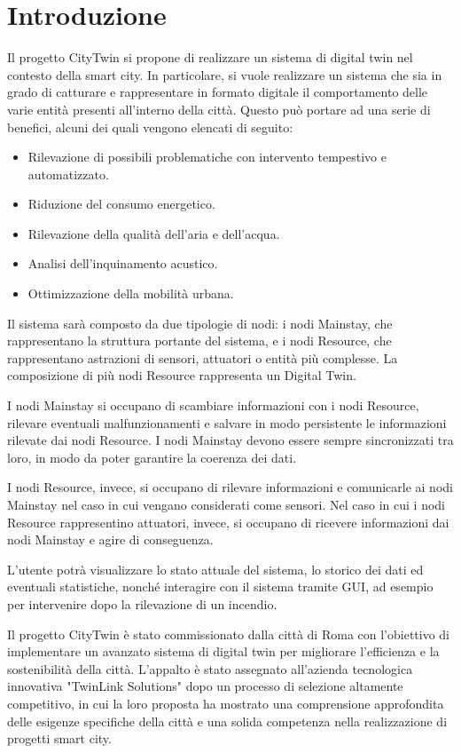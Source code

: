 \chapter{Introduzione}
Il progetto CityTwin si propone di realizzare un sistema di digital twin nel contesto della smart city. In particolare, si vuole realizzare un sistema che sia in grado di catturare e rappresentare in formato digitale il comportamento delle varie entità presenti all'interno della città. Questo può portare ad una serie di benefici, alcuni dei quali vengono elencati di seguito:

\begin{itemize}
    \item Rilevazione di possibili problematiche con intervento tempestivo e automatizzato.
    \item Riduzione del consumo energetico.
    \item Rilevazione della qualità dell'aria e dell'acqua.
    \item Analisi dell'inquinamento acustico.
    \item Ottimizzazione della mobilità urbana.
\end{itemize}

Il sistema sarà composto da due tipologie di nodi: i nodi Mainstay, che rappresentano la struttura portante del sistema, e i nodi Resource, che rappresentano astrazioni di sensori, attuatori o entità più complesse. La composizione di più nodi Resource rappresenta un Digital Twin.

I nodi Mainstay si occupano di scambiare informazioni con i nodi Resource, rilevare eventuali malfunzionamenti e salvare in modo persistente le informazioni rilevate dai nodi Resource. I nodi Mainstay devono essere sempre sincronizzati tra loro, in modo da poter garantire la coerenza dei dati.

I nodi Resource, invece, si occupano di rilevare informazioni e comunicarle ai nodi Mainstay nel caso in cui vengano considerati come sensori. Nel caso in cui i nodi Resource rappresentino attuatori, invece, si occupano di ricevere informazioni dai nodi Mainstay e agire di conseguenza.

L'utente potrà visualizzare lo stato attuale del sistema, lo storico dei dati ed eventuali statistiche, nonché interagire con il sistema tramite GUI, ad esempio per intervenire dopo la rilevazione di un incendio.

Il progetto CityTwin è stato commissionato dalla città di Roma con l'obiettivo di implementare un avanzato sistema di digital twin per migliorare l'efficienza e la sostenibilità della città. L'appalto è stato assegnato all'azienda tecnologica innovativa "TwinLink Solutions" dopo un processo di selezione altamente competitivo, in cui la loro proposta ha mostrato una comprensione approfondita delle esigenze specifiche della città e una solida competenza nella realizzazione di progetti smart city.

